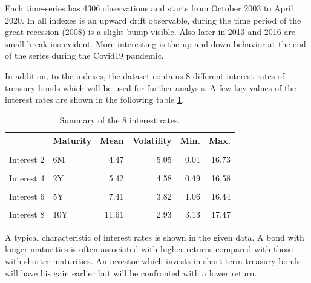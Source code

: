 \documentclass[
]{article}
\begin{document}
Each time-series has 4306 observations and starts from October 2003 to
April 2020. In all indexes is an upward drift observable, during the
time period of the great recession (2008) is a slight bump visible. Also
later in 2013 and 2016 are small break-ins evident. More interesting is
the up and down behavior at the end of the series during the Covid19
pandemic.

\newpage

In addition, to the indexes, the dataset contains 8 different interest
rates of treasury bonds which will be used for further analysis. A few
key-values of the interest rates are shown in the following table
\ref{tab:inttable}.

\begin{table}[!h]

\caption{\label{tab:inttable}Summary of the 8 interest rates.}
\centering
\begin{tabular}[t]{llrrrr}
\toprule
  & Maturity & Mean & Volatility & Min. & Max.\\
\midrule
\cellcolor{gray!6}{Interest 1} & \cellcolor{gray!6}{3M} & \cellcolor{gray!6}{4.09} & \cellcolor{gray!6}{4.95} & \cellcolor{gray!6}{-0.28} & \cellcolor{gray!6}{16.27}\\
Interest 2 & 6M & 4.47 & 5.05 & 0.01 & 16.73\\
\cellcolor{gray!6}{Interest 3} & \cellcolor{gray!6}{1Y} & \cellcolor{gray!6}{4.64} & \cellcolor{gray!6}{4.22} & \cellcolor{gray!6}{0.20} & \cellcolor{gray!6}{10.51}\\
Interest 4 & 2Y & 5.42 & 4.58 & 0.49 & 16.58\\
\cellcolor{gray!6}{Interest 5} & \cellcolor{gray!6}{3Y} & \cellcolor{gray!6}{6.16} & \cellcolor{gray!6}{4.33} & \cellcolor{gray!6}{0.75} & \cellcolor{gray!6}{16.51}\\
\addlinespace
Interest 6 & 5Y & 7.41 & 3.82 & 1.06 & 16.44\\
\cellcolor{gray!6}{Interest 7} & \cellcolor{gray!6}{7Y} & \cellcolor{gray!6}{9.50} & \cellcolor{gray!6}{3.31} & \cellcolor{gray!6}{1.71} & \cellcolor{gray!6}{16.63}\\
Interest 8 & 10Y & 11.61 & 2.93 & 3.13 & 17.47\\
\bottomrule
\end{tabular}
\end{table}

A typical characteristic of interest rates is shown in the given data. A
bond with longer maturities is often associated with higher returns
compared with those with shorter maturities. An investor which invests
in short-term treasury bonds will have his gain earlier but will be
confronted with a lower return.
\end{document}
